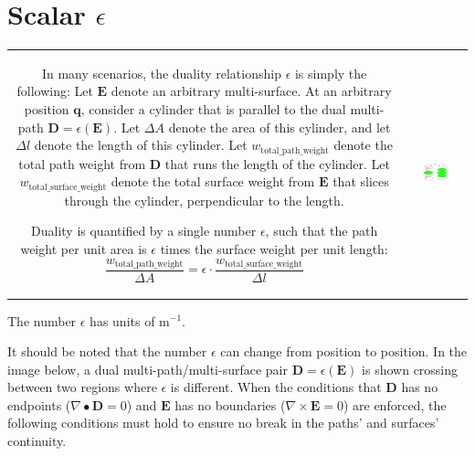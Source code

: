 \section{Scalar $\epsilon$}

\begin{tabular}{cc}
\parbox{0.5\textwidth}{
In many scenarios, the duality relationship \(\epsilon\) is simply the following: Let \(\mathbf{E}\) denote an arbitrary multi-surface. At an arbitrary position \(\mathbf{q}\), consider a cylinder that is parallel to the dual multi-path \(\mathbf{D} = \epsilon(\mathbf{E})\). Let \(\Delta A\) denote the area of this cylinder, and let \(\Delta l\) denote the length of this cylinder. Let \(w_{\text{total\_path\_weight}}\) denote the total path weight from \(\mathbf{D}\) that runs the length of the cylinder. Let \(w_{\text{total\_surface\_weight}}\) denote the total surface weight from \(\mathbf{E}\) that slices through the cylinder, perpendicular to the length. 

Duality is quantified by a single number \(\epsilon\), such that the path weight per unit area is \(\epsilon\) times the surface weight per unit length: 
\[\frac{w_{\text{total\_path\_weight}}}{\Delta A} = \epsilon \cdot \frac{w_{\text{total\_surface\_weight}}}{\Delta l}\]
} & \parbox{0.5\textwidth}{
\includegraphics[width = 0.5\textwidth]{Duality/scalar_epsilon}
}
\end{tabular}

The number \(\epsilon\) has units of \(\text{m}^{-1}\).

It should be noted that the number \(\epsilon\) can change from position to position. In the image below, a dual multi-path/multi-surface pair \(\mathbf{D} = \epsilon(\mathbf{E})\) is shown crossing between two regions where \(\epsilon\) is different. When the conditions that \(\mathbf{D}\) has no endpoints (\(\nabla \bullet \mathbf{D} = 0\)) and \(\mathbf{E}\) has no boundaries (\(\nabla \times \mathbf{E} = 0\)) are enforced, the following conditions must hold to ensure no break in the paths' and surfaces' continuity. 

